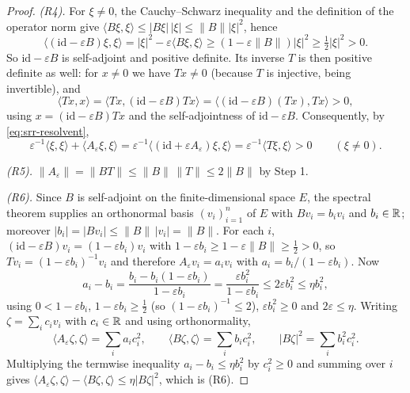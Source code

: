 \begin{proof}
\emph{(R4).} For $\xi\ne0$, the Cauchy--Schwarz inequality and the definition of
the operator norm give $\langle B\xi,\xi\rangle\le|B\xi|\,|\xi|\le\|B\||\xi|^2$,
hence
\[
  \langle(\mathrm{id}-\varepsilon B)\xi,\xi\rangle
   =|\xi|^2-\varepsilon\langle B\xi,\xi\rangle
   \ge(1-\varepsilon\|B\|)|\xi|^2\ge\tfrac12|\xi|^2>0 .
\]
So $\mathrm{id}-\varepsilon B$ is self-adjoint and positive definite. Its
inverse $T$ is then positive definite as well: for $x\ne0$ we have $Tx\ne0$
(because $T$ is injective, being invertible), and
\[
  \langle Tx,x\rangle=\bigl\langle Tx,(\mathrm{id}-\varepsilon B)Tx\bigr\rangle
   =\bigl\langle(\mathrm{id}-\varepsilon B)(Tx),Tx\bigr\rangle>0,
\]
using $x=(\mathrm{id}-\varepsilon B)Tx$ and the self-adjointness of
$\mathrm{id}-\varepsilon B$. Consequently, by \eqref{eq:srr-resolvent},
\[
  \varepsilon^{-1}\langle\xi,\xi\rangle+\langle A_\varepsilon\xi,\xi\rangle
   =\varepsilon^{-1}\bigl\langle(\mathrm{id}
     +\varepsilon A_\varepsilon)\xi,\xi\bigr\rangle
   =\varepsilon^{-1}\langle T\xi,\xi\rangle>0\qquad(\xi\ne0).
\]

\emph{(R5).} $\|A_\varepsilon\|=\|BT\|\le\|B\|\,\|T\|\le2\|B\|$ by Step 1.

\emph{(R6).} Since $B$ is self-adjoint on the finite-dimensional space $E$, the
spectral theorem supplies an orthonormal basis $(v_i)_{i=1}^n$ of $E$ with
$Bv_i=b_iv_i$ and $b_i\in\mathbb{R}$; moreover
$|b_i|=|Bv_i|\le\|B\|\,|v_i|=\|B\|$. For each $i$,
$(\mathrm{id}-\varepsilon B)v_i=(1-\varepsilon b_i)v_i$ with
$1-\varepsilon b_i\ge1-\varepsilon\|B\|\ge\tfrac12>0$, so $Tv_i=
(1-\varepsilon b_i)^{-1}v_i$ and therefore $A_\varepsilon v_i=a_iv_i$ with
$a_i=b_i/(1-\varepsilon b_i)$. Now
\[
  a_i-b_i=\frac{b_i-b_i(1-\varepsilon b_i)}{1-\varepsilon b_i}
   =\frac{\varepsilon b_i^2}{1-\varepsilon b_i}\le2\varepsilon b_i^2\le\eta b_i^2 ,
\]
using $0<1-\varepsilon b_i$, $1-\varepsilon b_i\ge\tfrac12$ (so
$(1-\varepsilon b_i)^{-1}\le2$), $\varepsilon b_i^2\ge0$ and
$2\varepsilon\le\eta$. Writing $\zeta=\sum_ic_iv_i$ with $c_i\in\mathbb{R}$ and using
orthonormality,
\[
  \langle A_\varepsilon\zeta,\zeta\rangle=\sum_ia_ic_i^2,\qquad
  \langle B\zeta,\zeta\rangle=\sum_ib_ic_i^2,\qquad
  |B\zeta|^2=\sum_ib_i^2c_i^2 .
\]
Multiplying the termwise inequality $a_i-b_i\le\eta b_i^2$ by $c_i^2\ge0$ and
summing over $i$ gives
$\langle A_\varepsilon\zeta,\zeta\rangle-\langle B\zeta,\zeta\rangle
\le\eta|B\zeta|^2$, which is (R6).
\end{proof}
